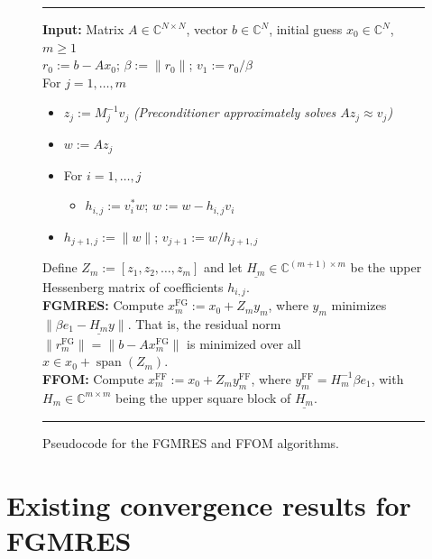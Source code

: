 \documentclass{siamart251216}
\DeclareMathOperator{\spn}{span}
\def\C{\mathbb{C}}
\begin{document}
\begin{figure}[ht]
    \centering
    \begin{minipage}{1\textwidth}
        \hrule \vspace{2mm}
        \textbf{Input:} Matrix $A\in\C^{N\times N}$, vector $b\in\C^N$, initial guess $x_0\in\C^N$, $m\geq 1$ \\[1mm]
        $r_0 := b - Ax_0$; $\beta := \| r_0\|$; $v_1 := r_0/\beta$ \\[1mm]
        For $j=1,\ldots,m$
        \begin{itemize}
            \item[] $z_j := M_j^{-1} v_j$ \hfill \textit{\small (Preconditioner approximately solves $A z_j\approx v_j$)}
            \item[] $w := A z_j$
            \item[] For $i = 1,\dots,j$
                  \begin{itemize}
                      \item[] $h_{i,j} := v_i^* w$; \quad $w :=  w - h_{i,j}v_i$
                  \end{itemize}
            \item[] $h_{j+1,j} := \| w\|$; \quad $v_{j+1} := w / h_{j+1,j}$
        \end{itemize}
        \smallskip
        Define $Z_{m} := [ z_1,z_2,\ldots,z_{m} ]$ and let $\underline{H_m} \in \C^{(m+1)\times m}$ be the upper Hessenberg matrix of coefficients $h_{i,j}$. \\[2mm]
        \textbf{FGMRES:} Compute $x_m^{\mathrm{FG}}:= x_0 + Z_m y_m$, where $y_m$ minimizes $\|\beta e_1 - \underline{H_m} y \|$. That is, the residual norm $\|r_m^{\mathrm{FG}}\| = \| b - A x_m^{\mathrm{FG}} \|$ is minimized over all $x \in x_0 + \spn(Z_m)$. \\[1mm]
        \textbf{FFOM:} Compute $x_m^{\mathrm{FF}} := x_0 + Z_m y_m^{\mathrm{FF}}$, where $y_m^{\mathrm{FF}} = H_m^{-1}\beta e_1$, with $H_m \in \C^{m \times m}$ being the upper square block of $\underline{H_m}$.
        \vspace{2mm} \hrule
    \end{minipage}
    \caption{Pseudocode for the FGMRES and FFOM algorithms.}
    \label{fig:fgmres}
\end{figure}







\section{Existing convergence results for FGMRES}
\label{sec:review}
\end{document}
